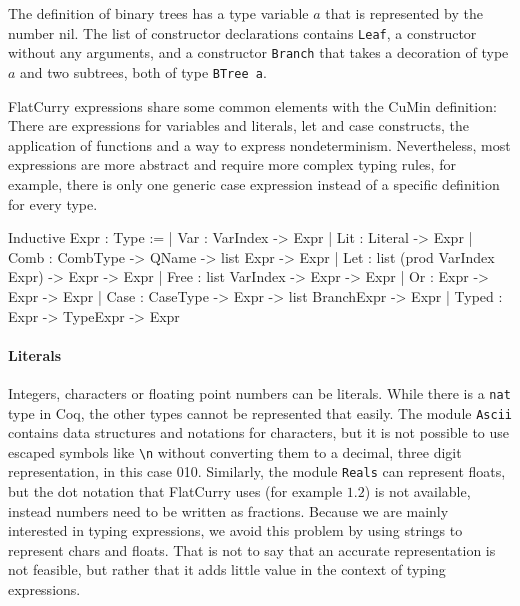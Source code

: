 \documentclass[fleqn, abstract=on]{scrreprt}
\begin{document}
The definition of binary trees has a type variable $a$ that is represented by the number nil. The list of constructor declarations contains \texttt{Leaf}, a constructor without any arguments, and a constructor \texttt{Branch} that takes a decoration of type $a$ and two subtrees, both of type \texttt{BTree a}.\\
\par
FlatCurry expressions share some common elements with the CuMin definition: There are expressions for variables and literals, let and case constructs, the application of functions and a way to express nondeterminism. Nevertheless, most expressions are more abstract and require more complex typing rules, for example, there is only one generic case expression instead of a specific definition for every type.
\begin{coqcode}
Inductive Expr : Type := 
  | Var   : VarIndex -> Expr
  | Lit   : Literal -> Expr
  | Comb  : CombType -> QName -> list Expr -> Expr
  | Let   : list (prod VarIndex Expr) -> Expr -> Expr
  | Free  : list VarIndex -> Expr -> Expr
  | Or    : Expr -> Expr -> Expr
  | Case  : CaseType -> Expr -> list BranchExpr -> Expr
  | Typed : Expr -> TypeExpr -> Expr
\end{coqcode}
\paragraph{Literals}
Integers, characters or floating point numbers can be literals. While there is a \texttt{nat} type in Coq, the other types cannot be represented that easily. The module \texttt{Ascii} contains data structures and notations for characters, but it is not possible to use escaped symbols like \texttt{\textbackslash n} without converting them to a decimal, three digit representation, in this case 010. Similarly, the module \texttt{Reals} can represent floats, but the dot notation that FlatCurry uses (for example $1.2$) is not available, instead numbers need to be written as fractions. Because we are mainly interested in typing expressions, we avoid this problem by using strings to represent chars and floats. That is not to say that an accurate representation is not feasible, but rather that it adds little value in the context of typing expressions. 
\end{document}
